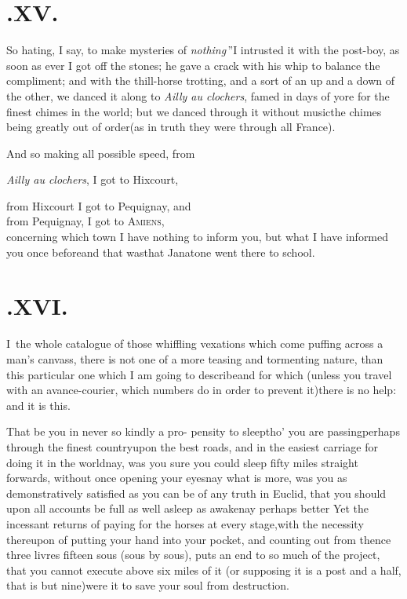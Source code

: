 \documentclass{article}
\begin{document}
\newpage
\section{.\enspace XV.}

\quad\tsh \lqq So hating, I say, to make\break
mysteries
of \textit{nothing}\,”\tsh I intrusted it with the
post-boy, as soon as ever I got off the stones; he gave a crack
with his whip to balance the compliment;\break
and with the thill-horse
trotting, and a sort of an up and a down of the other, we danced it
along to \textit{Ailly au clochers}, famed in days of yore for the
finest chimes in the world; but we danced through it without
music\tsk the chimes being greatly out of order\tsk (as in
truth they were through all France).

And so making all possible speed, from

\noindent
\textit{Ailly au clochers}, I got to Hixcourt,

\newpage\noindent
from Hixcourt I got to Pequignay, and\\
from Pequignay, I got to \textsc{Amiens},\\[4pt]
concerning which town I have nothing to inform you, but what I have
informed you once before\tsh and that was\tsh that
Janatone went there to school.

\section{.\enspace XVI.}

\lettrine{I}{\,} the whole catalogue of those
whiffling vexations which come puffing across a man’s
canvass, there is not one of a more teasing and tormenting nature,
than this particular one which I am going to
describe\tsh and for which (unless you travel with an
avance-courier, which numbers do in order to prevent
it)\tsh there is no help: and it is this.

That be you in never so kindly a pro-\break
pensity to sleep\tsh tho’ you are passing\pb perhaps through the
finest country\tsk upon the best roads, and in the easiest
carriage for doing it in the world\tsh nay, was you sure you could sleep fifty miles straight
forwards, without once opening your eyes\tsk nay what is more,
was you as demonstratively satisfied as you can be of any truth in
Euclid, that you should upon all accounts be full as well
asleep as awake\tsh nay perhaps better\tsh\break
Yet the incessant returns of paying for the horses at every
stage,\tsh with the necessity thereupon of putting your
hand into your pocket, and counting out from thence three livres
fifteen sous (sous by sous), puts an end to so much of the project,
that you cannot execute above six miles of it (or supposing it is a
post and a half, that is but nine)\tsh were it to save
your soul from destruction.
\end{document}
